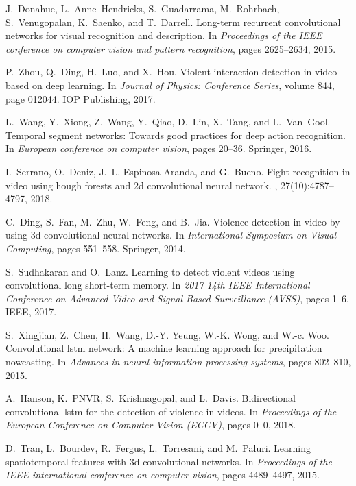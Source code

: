 \documentclass[10pt,twocolumn,letterpaper]{article}
\begin{document}
{\begin{thebibliography}{10}
J.~Donahue, L.~Anne~Hendricks, S.~Guadarrama, M.~Rohrbach, S.~Venugopalan,
	K.~Saenko, and T.~Darrell.
\newblock Long-term recurrent convolutional networks for visual recognition and
	description.
\newblock In {\em Proceedings of the IEEE conference on computer vision and
	pattern recognition}, pages 2625--2634, 2015.

P.~Zhou, Q.~Ding, H.~Luo, and X.~Hou.
\newblock Violent interaction detection in video based on deep learning.
\newblock In {\em Journal of Physics: Conference Series}, volume 844, page
	012044. IOP Publishing, 2017.

L.~Wang, Y.~Xiong, Z.~Wang, Y.~Qiao, D.~Lin, X.~Tang, and L.~Van~Gool.
\newblock Temporal segment networks: Towards good practices for deep action
	recognition.
\newblock In {\em European conference on computer vision}, pages 20--36.
	Springer, 2016.

I.~Serrano, O.~Deniz, J.~L. Espinosa-Aranda, and G.~Bueno.
\newblock Fight recognition in video using hough forests and 2d convolutional
	neural network.
, 27(10):4787--4797, 2018.

C.~Ding, S.~Fan, M.~Zhu, W.~Feng, and B.~Jia.
\newblock Violence detection in video by using 3d convolutional neural
	networks.
\newblock In {\em International Symposium on Visual Computing}, pages 551--558.
	Springer, 2014.

S.~Sudhakaran and O.~Lanz.
\newblock Learning to detect violent videos using convolutional long short-term
	memory.
\newblock In {\em 2017 14th IEEE International Conference on Advanced Video and
	Signal Based Surveillance (AVSS)}, pages 1--6. IEEE, 2017.

S.~Xingjian, Z.~Chen, H.~Wang, D.-Y. Yeung, W.-K. Wong, and W.-c. Woo.
\newblock Convolutional lstm network: A machine learning approach for
	precipitation nowcasting.
\newblock In {\em Advances in neural information processing systems}, pages
	802--810, 2015.

A.~Hanson, K.~PNVR, S.~Krishnagopal, and L.~Davis.
\newblock Bidirectional convolutional lstm for the detection of violence in
	videos.
\newblock In {\em Proceedings of the European Conference on Computer Vision
	(ECCV)}, pages 0--0, 2018.

D.~Tran, L.~Bourdev, R.~Fergus, L.~Torresani, and M.~Paluri.
\newblock Learning spatiotemporal features with 3d convolutional networks.
\newblock In {\em Proceedings of the IEEE international conference on computer
	vision}, pages 4489--4497, 2015.


\end{thebibliography}}
\end{document}
